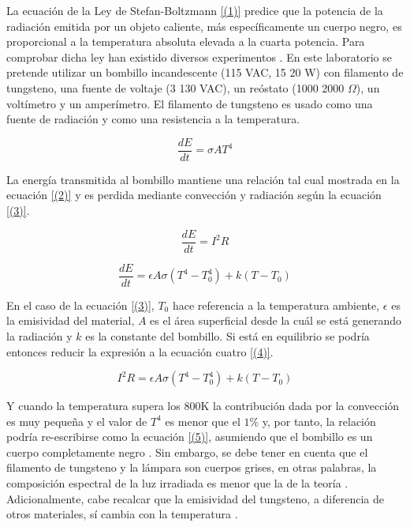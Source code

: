 \documentclass[%
 reprint,
 amsmath,amssymb,
 aps,
]{revtex4-1}
\begin{document}
La ecuación de la Ley de Stefan-Boltzmann \eqref{(1)} predice que la potencia de la radiación emitida por un
objeto caliente, más específicamente un cuerpo negro, es proporcional a la temperatura absoluta elevada a la cuarta potencia. Para comprobar dicha ley han existido diversos experimentos \cite{revisiting}. En este laboratorio se pretende utilizar un bombillo incandescente (115 VAC, 15 20 W) con filamento de tungsteno, una fuente de voltaje (3 130 VAC), un reóstato (1000 2000 $\Omega$), un voltímetro y un amperímetro. El filamento de tungsteno es usado como una fuente de radiación y como una resistencia a la temperatura.

\begin{equation}\label{(1)}
  \frac{dE}{dt} =\sigma A T^4
\end{equation}

La energía transmitida al bombillo mantiene una relación tal cual mostrada en la ecuación \eqref{(2)} y es perdida mediante convección y radiación según la ecuación \eqref{(3)}.

\begin{equation}\label{(2)}
  \frac{dE}{dt}=I^2 R
\end{equation}

\begin{equation}\label{(3)}
  \frac{dE}{dt}=\epsilon A \sigma (T^4 - T_0^4) + k(T - T_0)
\end{equation}

En el caso de la ecuación \eqref{(3)}, $T_0$ hace referencia a la temperatura ambiente, $\epsilon$ es la emisividad del material, $A$ es el área superficial desde la cuál se está generando la radiación y $k$ es la constante del bombillo. Si está en equilibrio se podría entonces reducir la expresión a la ecuación cuatro \eqref{(4)}.

\begin{equation}\label{(4)}
  I^2 R = \epsilon A \sigma (T^4 - T_0^4) + k(T - T_0)
\end{equation}

Y cuando la temperatura supera los 800K la contribución dada por la convección es muy pequeña y el valor de $T^4$ es menor que el $1\%$ y, por tanto, la relación podría re-escribirse como la ecuación \eqref{(5)}, asumiendo que el bombillo es un cuerpo completamente negro \cite{Law}. Sin embargo, se debe tener en cuenta que el filamento de tungsteno y la lámpara son cuerpos grises, en otras palabras, la composición espectral de la luz irradiada es menor que la de la teoría \cite{Cuestiones}. Adicionalmente, cabe recalcar que la emisividad del tungsteno, a diferencia de otros materiales, sí cambia con la temperatura \cite{electric}.
\end{document}
